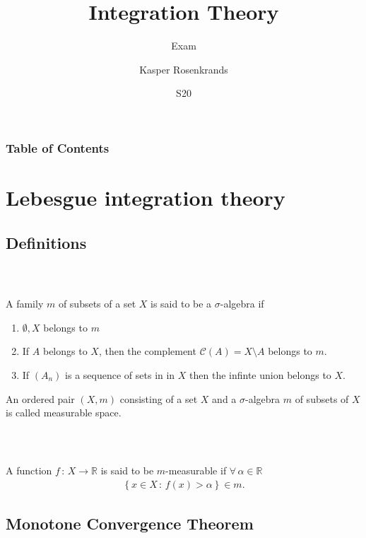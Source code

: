 \documentclass{beamer}
\title{Integration Theory}
\subtitle{Exam}
\author{Kasper Rosenkrands}
\institute{Aalborg University}
\date{S20}
\numberwithin{equation}{section}
\begin{document}
\frame{\titlepage}

\begin{frame}
\frametitle{Table of Contents}
\tableofcontents[hideallsubsections]
\end{frame}

\section{Lebesgue integration theory}

\subsection{Definitions}

\begin{frame}\frametitle{{\normalsize \secname} \\ {\large \subsecname}}
    \begin{definition}
        A family $m$ of subsets of a set $X$ is said to be a $\sigma$-algebra if
        \begin{enumerate}
            \item $\emptyset, X$ belongs to $m$
            \item If $A$ belongs to $X$, then the complement $\mathcal{C}(A) = X \setminus A$ belongs to $m$. 
            \item If $(A_n)$ is a sequence of sets in in $X$ then the infinte union belongs to $X$. 
        \end{enumerate}
        An ordered pair $(X, m)$ consisting of a set $X$ and a $\sigma$-algebra $m$ of subsets of $X$ is called measurable space.
    \end{definition}
\end{frame}

\begin{frame}\frametitle{{\normalsize \secname} \\ {\large \subsecname}}
    \begin{definition}
        A function $f \, : \, X \to \mathbb{R}$ is said to be $m$-measurable if $\forall \, \alpha \in \mathbb{R}$
        \begin{align}
            \left\{ x \in X \, : \, f(x) > \alpha \right\} \in m.
        \end{align}
    \end{definition}
\end{frame}

\subsection{Monotone Convergence Theorem}
\end{document}
